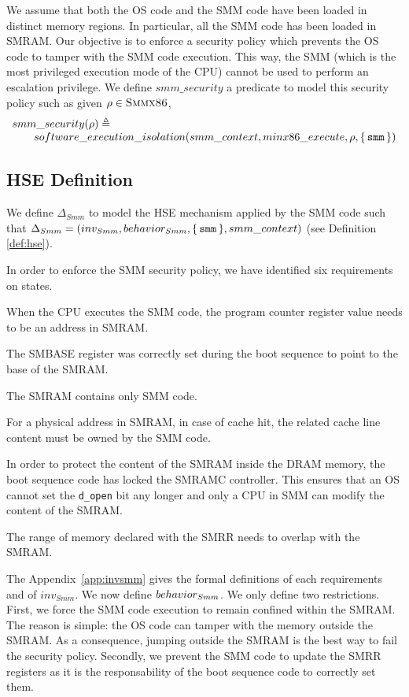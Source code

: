 We assume that both the OS code and the SMM code have been loaded in distinct
memory regions. In particular, all the SMM code has been loaded in SMRAM. Our
objective is to enforce a security policy which prevents the OS code to tamper
with the SMM code execution. This way, the SMM (which is the most privileged
execution mode of the CPU) cannot be used to perform an escalation privilege. We
define $smm\_security$ a predicate to model this security policy such as given
$\rho \in \textsc{Smmx86}$, \[ \begin{array}{l} smm\_security(\rho)
\triangleq \\ \qquad software\_execution\_isolation(smm\_context,
minx86\_execute, \rho, \{\,\mathtt{smm}\,\}) \end{array} \]

\subsection{HSE Definition}

We define $\Delta_{Smm}$ to model the HSE mechanism applied by the SMM code such
that $\Delta_{Smm} = (inv_{Smm}, behavior_{Smm}, \{\,\mathtt{smm}\,\},
smm\_context)$ (see Definition \ref{def:hse}).

In order to enforce the SMM security policy, we have identified six requirements
on states.
\begin{compactitem}
\item When the CPU executes the SMM code, the program counter register value
needs to be an address in SMRAM.
\item The SMBASE register was correctly set during the boot sequence to point to
  the base of the SMRAM.
\item The SMRAM contains only SMM code.
\item For a physical address in SMRAM, in case of cache hit, the related cache
  line content must be owned by the SMM code.
\item In order to protect the content of the SMRAM inside the DRAM memory, the
  boot sequence code has locked the SMRAMC controller. This ensures that an OS
  cannot set the \texttt{d\_open} bit any longer and only a CPU in SMM can
  modify the content of the SMRAM.
\item The range of memory declared with the SMRR needs to overlap with the
  SMRAM.
\end{compactitem}

The Appendix~\ref{app:invsmm} gives the formal definitions of each requirements
and of $inv_{Smm}$.  We now define $behavior_{Smm}$. We only define two
restrictions. First, we force the SMM code execution to remain confined within
the SMRAM. The reason is simple: the OS code can tamper with the memory outside
the SMRAM. As a consequence, jumping outside the SMRAM is the best way to fail
the security policy. Secondly, we prevent the SMM code to update the SMRR
registers as it is the responsability of the boot sequence code to correctly set
them.

